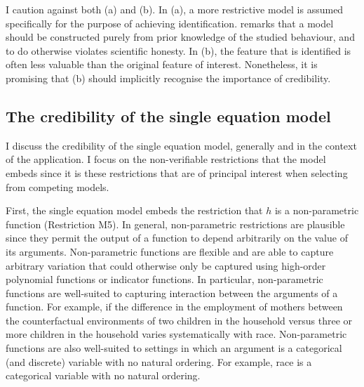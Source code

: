 \documentclass[10pt,a4paper,twoside]{article}
\newcommand\independent{\protect\mathpalette{\protect\independenT}{\perp}}
\def\independenT#1#2{\mathrel{\rlap{$#1#2$}\mkern2mu{#1#2}}}
\numberwithin{equation}{section}
\begin{document}
I caution against both (a) and (b). In (a), a more restrictive model is assumed specifically for the purpose of achieving identification. \cite{krE50} remarks that a model should be constructed purely from prior knowledge of the studied behaviour, and to do otherwise violates scientific honesty. In (b), the feature that is identified is often less valuable than the original feature of interest. Nonetheless, it is promising that (b) should implicitly recognise the importance of credibility.
\subsection{The credibility of the single equation model}
I discuss the credibility of the single equation model, generally and in the context of the application. I focus on the non-verifiable restrictions that the model embeds since it is these restrictions that are of principal interest when selecting from competing models.

First, the single equation model embeds the restriction that $h$ is a non-parametric function (Restriction M5). In general, non-parametric restrictions are plausible since they permit the output of a function to depend arbitrarily on the value of its arguments. Non-parametric functions are flexible and are able to capture arbitrary variation that could otherwise only be captured using high-order polynomial functions or indicator functions. In particular, non-parametric functions are well-suited to capturing interaction between the arguments of a function. For example, if the difference in the employment of mothers between the counterfactual environments of two children in the household versus three or more children in the household varies systematically with race. Non-parametric functions are also well-suited to settings in which an argument is a categorical (and discrete) variable with no natural ordering. For example, race is a categorical variable with no natural ordering. 
\end{document}
